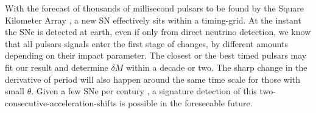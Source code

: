 \documentclass[aps,showpacs,onecolumn,floats,prd,superscriptaddress,nofootinbib]{revtex4}
\begin{document}
With the forecast of thousands of millisecond pulsars to be found by the Square Kilometer Array \cite{SKA}, a new SN effectively sits within a timing-grid. At the instant the SNe is detected at earth, even if only from direct neutrino detection, we know that all pulsars signals enter the first stage of changes, by different amounts depending on their impact parameter. The closest or the best timed pulsars may fit our result and determine $\delta M$ within a decade or two. The sharp change in the derivative of period will also happen around the same time scale for those with small $\theta$. Given a few SNe per century \cite{SNrate06}, a signature detection of this two-consecutive-acceleration-shifts is possible in the foreseeable future.

\end{document}
